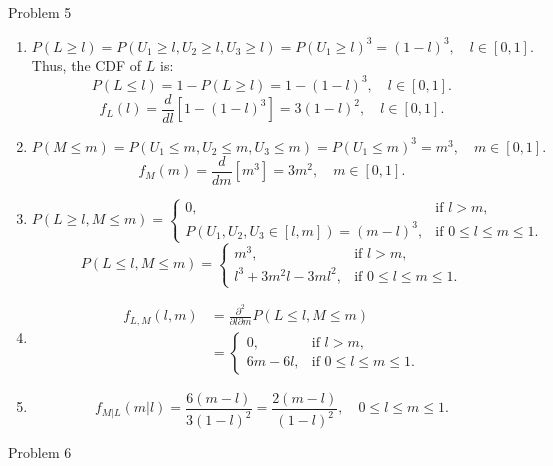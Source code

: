 \documentclass[12pt,letterpaper, onecolumn]{exam}
\begin{document}
\begin{questions}
\begin{solution}
\begin{enumerate}
        \end{enumerate}
    

    \end{solution}
    \question Problem 5
    \begin{solution}
    \begin{enumerate}
        \item \[P(L \geq l) = P(U_1 \geq l, U_2 \geq l, U_3 \geq l) = P(U_1 \geq l)^3 = (1 - l)^3, \quad l \in [0, 1].\]
        Thus, the CDF of $L$ is:
        \[
        P(L \leq l) = 1 - P(L \geq l) = 1 - (1 - l)^3, \quad l \in [0, 1].
        \]
        \[
        f_L(l) = \frac{d}{dl}\left[1 - (1 - l)^3\right] = 3(1 - l)^2, \quad l \in [0, 1].
        \]
        \item \[
        P(M \leq m) = P(U_1 \leq m, U_2 \leq m, U_3 \leq m) = P(U_1 \leq m)^3 = m^3, \quad m \in [0, 1].
        \]
        \[
        f_M(m) = \frac{d}{dm}[m^3] = 3m^2, \quad m \in [0, 1].
        \]
        \item \[
        P(L \geq l, M \leq m) = 
        \begin{cases} 
        0, & \text{if } l > m, \\
        P(U_1, U_2, U_3 \in [l, m]) = (m - l)^3, & \text{if } 0 \leq l \leq m \leq 1.
        \end{cases}
        \]
        \[
        P(L \leq l, M \leq m) = 
        \begin{cases} 
        m^3, & \text{if } l > m, \\
        l^3+3m^2l-3ml^2, & \text{if } 0 \leq l \leq m \leq 1.
        \end{cases}
        \]
        \item \begin{align*}
            f_{L,M}(l, m) & = \frac{\partial^2}{\partial l \partial m} P(L \leq l, M \leq m) \\
            & = \begin{cases} 
        0, & \text{if } l > m, \\
        6m-6l, & \text{if } 0 \leq l \leq m \leq 1.
        \end{cases}
        \end{align*}
        \item \[
    f_{M|L}(m|l) = \frac{6(m - l)}{3(1 - l)^2} = \frac{2(m - l)}{(1 - l)^2}, \quad 0 \leq l \leq m \leq 1.
    \]
    \end{enumerate}
    \end{solution}
    \question Problem 6
    \begin{solution}

\end{solution}
\end{questions}
\end{document}
